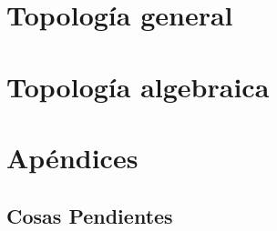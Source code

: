 \documentclass[a4paper, 10pt, oneside, titlepage, openany, onecolumn, final]{book}
\title{\tb{Topología Elemental}}
\author{Álvaro García Tenorio \and Manuel Navarro García\and Iván Prada Cazalla \and Álvaro Rodríguez García \and Clara Rodríguez Núñez}
\date{\today}
\begin{document}
	\maketitle
	\tableofcontents
		
	
	
	\part{Topología general}	
	
	
	
	
	 
	
	
	
	\part{Topología algebraica}
	
	
	\appendix
	\part{Apéndices}
	
	
	\chapter{Cosas Pendientes}
	
	
	
	
	
	
	
	
	\printindex[general]
	\printindex[topologias]
\end{document}
